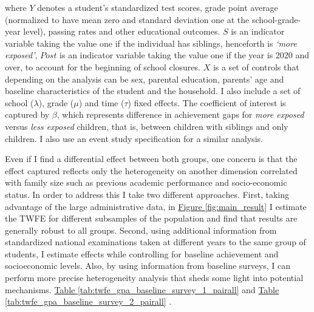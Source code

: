 where $Y$ denotes a student’s standardized test scores, grade point average (normalized to have mean zero and standard deviation one at the school-grade-year level), passing rates and other educational outcomes. $S$ is an indicator variable taking the value one if the individual has siblings, henceforth is \textit{‘more exposed’}, $Post$ is an indicator variable taking the value one if the year is 2020 and over, to account for the beginning of school closures. $X$ is a set of controls that depending on the analysis can be sex, parental education, parents' age and baseline characteristics of the student and the household. I also include a set of school  ($\lambda$), grade  ($\mu$) and time ($\tau$) fixed effects.  The coefficient of interest is captured by $\beta$, which represents difference in achievement gaps for \textit{more exposed} versus \textit{less exposed} children, that is, between children with siblings and only children. I also use an event study specification for a similar analysis.

Even if I find a differential effect between both groups, one concern is that the effect captured reflects only the heterogeneity on another dimension correlated with family size such as previous academic performance and socio-economic status. In order to address this I take two different approaches. First, taking advantage of the large administrative data, in \hyperref[fig:main_result]{Figure \ref{fig:main_result}} I estimate the TWFE for different subsamples of the population and find that results are generally robust to all groups. Second, using additional information from standardized national examinations taken at different years to the same group of students, I estimate effects while controlling for baseline achievement and socioeconomic levels. Also, by using information from baseline surveys, I can perform more precise heterogeneity analysis that sheds some light into potential mechanisms. \hyperref[tab:twfe_gpa_baseline_survey_1_pairall]{Table \ref{tab:twfe_gpa_baseline_survey_1_pairall}}
 and \hyperref[tab:twfe_gpa_baseline_survey_2_pairall]{Table \ref{tab:twfe_gpa_baseline_survey_2_pairall}}
.


